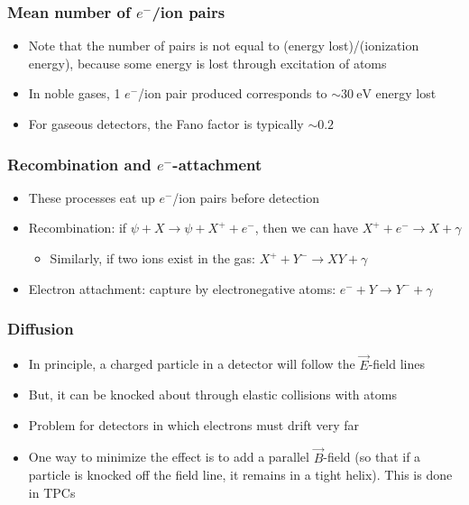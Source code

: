 \documentclass[11pt]{article}
\newcommand{\E}{\ensuremath{\vec{E}}}
\newcommand{\B}{\ensuremath{\vec{B}}}
\newcommand{\ev}{\text{eV}}
\newcommand{\el}{\ensuremath{e^{-}}\xspace}
\begin{document}
\subsubsection{Mean number of $\el$/ion pairs}
\begin{itemize}
  \item Note that the number of pairs is not equal to (energy lost)/(ionization energy), because some energy is lost through excitation of atoms
  \item In noble gases, 1 $\el$/ion pair produced corresponds to $\sim30~\ev$ energy lost
  \item For gaseous detectors, the Fano factor is typically $\sim 0.2$
\end{itemize}
\subsubsection{Recombination and $\el$-attachment}
\begin{itemize}
  \item These processes eat up $\el$/ion pairs before detection
  \item Recombination: if $\psi+X\rightarrow \psi+X^++\el$, then we can have $X^++\el \rightarrow X+\gamma$
  \begin{itemize}
    \item Similarly, if two ions exist in the gas: $X^++Y^- \rightarrow XY+\gamma$
  \end{itemize}
  \item Electron attachment: capture by electronegative atoms: $\el+Y \rightarrow Y^- + \gamma$
\end{itemize}
\subsubsection{Diffusion}
\begin{itemize}
  \item In principle, a charged particle in a detector will follow the $\E$-field lines
  \item But, it can be knocked about through elastic collisions with atoms
  \item Problem for detectors in which electrons must drift very far
  \item One way to minimize the effect is to add a parallel $\B$-field (so that if a particle is knocked off the field line, it remains in a tight helix). This is done in TPCs
\end{itemize}
\end{document}

